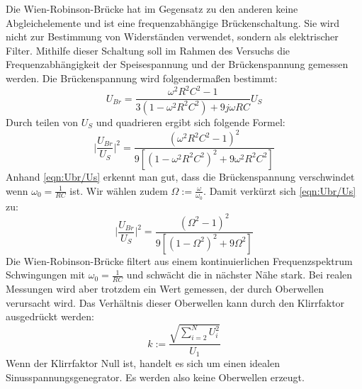 Die Wien-Robinson-Brücke hat im Gegensatz zu den anderen keine Abgleichelemente und ist eine frequenzabhängige Brückenschaltung. Sie wird
nicht zur Bestimmung von Widerständen verwendet, sondern als elektrischer Filter. Mithilfe dieser Schaltung soll im Rahmen des Versuchs die
Frequenzabhängigkeit der Speisespannung und der Brückenspannung gemessen werden.
Die Brückenspannung wird folgendermaßen bestimmt:
\begin{equation}
    U_{Br} = \frac{\omega ^2 R^2 C^2 - 1}{3(1- \omega ^2 R^2 C^2) + 9 j \omega RC}U_S
\end{equation}
Durch teilen von $U_S$ und quadrieren ergibt sich folgende Formel:
\begin{equation}
    \biggl|\frac{U_{Br}}{U_S}\biggl|^2 = \frac{(\omega ^2 R^2 C^2 - 1)^2}{9[(1- \omega ^2 R^2 C^2)^2 + 9 \omega^2 R^2C^2]} \label{eqn:Ubr/Us}
\end{equation}
Anhand \autoref{eqn:Ubr/Us} erkennt man gut, dass die Brückenspannung verschwindet wenn $\omega_0 = \frac{1}{RC}$ ist. Wir wählen zudem $\Omega := \frac{\omega}{\omega_0}$.
Damit verkürzt sich \autoref{eqn:Ubr/Us} zu:
\begin{equation}
    \biggl|\frac{U_{Br}}{U_S}\biggl|^2 = \frac{(\Omega ^2 - 1)^2}{9[(1-\Omega ^2)^2 + 9 \Omega ^2]} \label{eqn:Omega}
\end{equation}
Die Wien-Robinson-Brücke filtert aus einem kontinuierlichen Frequenzspektrum Schwingungen mit $\omega_0 = \frac{1}{RC}$ und schwächt die in nächster Nähe stark. Bei
realen Messungen wird aber trotzdem ein Wert gemessen, der durch Oberwellen verursacht wird. Das Verhältnis dieser Oberwellen kann durch den Klirrfaktor ausgedrückt werden:
\begin{equation}
    k := \frac{\sqrt{\sum_{i=2}^N U_i^2}}{U_1} \label{eqn:Klirrfaktor}
\end{equation} 
Wenn der Klirrfaktor Null ist, handelt es sich um einen idealen Sinusspannungsgenegrator. Es werden also keine Oberwellen erzeugt.

\newpage